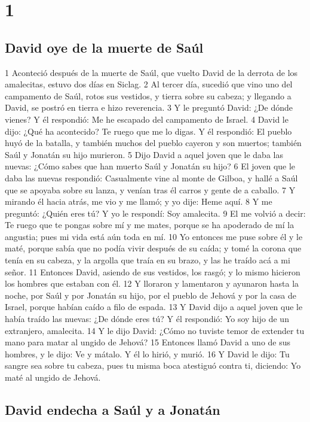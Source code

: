 
\chapter{1}

\section*{David oye de la muerte de Saúl}

1 Aconteció después de la muerte de Saúl, que vuelto David de la derrota de los amalecitas, estuvo dos días en Siclag.
2 Al tercer día, sucedió que vino uno del campamento de Saúl, rotos sus vestidos, y tierra sobre su cabeza; y llegando a David, se postró en tierra e hizo reverencia.
3 Y le preguntó David: ¿De dónde vienes? Y él respondió: Me he escapado del campamento de Israel.
4 David le dijo: ¿Qué ha acontecido? Te ruego que me lo digas. Y él respondió: El pueblo huyó de la batalla, y también muchos del pueblo cayeron y son muertos; también Saúl y Jonatán su hijo murieron.
5 Dijo David a aquel joven que le daba las nuevas: ¿Cómo sabes que han muerto Saúl y Jonatán su hijo?
6 El joven que le daba las nuevas respondió: Casualmente vine al monte de Gilboa, y hallé a Saúl que se apoyaba sobre su lanza, y venían tras él carros y gente de a caballo.
7 Y mirando él hacia atrás, me vio y me llamó; y yo dije: Heme aquí.
8 Y me preguntó: ¿Quién eres tú? Y yo le respondí: Soy amalecita.
9 El me volvió a decir: Te ruego que te pongas sobre mí y me mates, porque se ha apoderado de mí la angustia; pues mi vida está aún toda en mí.
10 Yo entonces me puse sobre él y le maté, porque sabía que no podía vivir después de su caída; y tomé la corona que tenía en su cabeza, y la argolla que traía en su brazo, y las he traído acá a mi señor. 
11 Entonces David, asiendo de sus vestidos, los rasgó; y lo mismo hicieron los hombres que estaban con él.
12 Y lloraron y lamentaron y ayunaron hasta la noche, por Saúl y por Jonatán su hijo, por el pueblo de Jehová y por la casa de Israel, porque habían caído a filo de espada.
13 Y David dijo a aquel joven que le había traído las nuevas: ¿De dónde eres tú? Y él respondió: Yo soy hijo de un extranjero, amalecita.
14 Y le dijo David: ¿Cómo no tuviste temor de extender tu mano para matar al ungido de Jehová?
15 Entonces llamó David a uno de sus hombres, y le dijo: Ve y mátalo. Y él lo hirió, y murió.
16 Y David le dijo: Tu sangre sea sobre tu cabeza, pues tu misma boca atestiguó contra ti, diciendo: Yo maté al ungido de Jehová.

\section*{David endecha a Saúl y a Jonatán}

